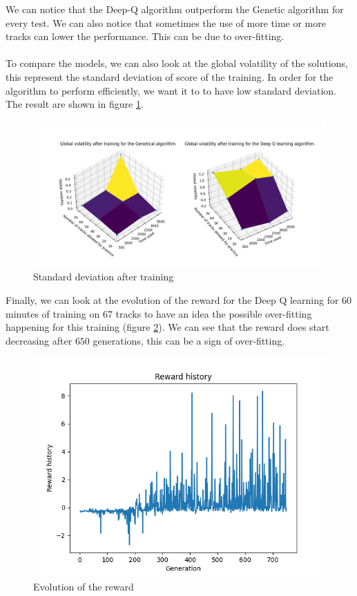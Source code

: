 \documentclass[11pt,a4paper]{article}
\newcounter{fig}
\begin{document}
We can notice that the Deep-Q algorithm outperform the Genetic algorithm for every test. We can also notice that sometimes the use of more time or more tracks can lower the performance. This can be due to over-fitting. \\
\\
To compare the models, we can also look at the global volatility of the solutions, this represent the standard deviation of score of the training. In order for the algorithm to perform efficiently, we want it to to have low standard deviation. The result are shown in figure \ref{figure:standard deviation}.
        \begin{figure}[ht]
            \centering
            \includegraphics[scale = 0.55]{comparaison3.png}
            \caption{Standard deviation after training}
            \label{figure:standard deviation}
        \end{figure}
 
\newpage
Finally, we can look at the evolution of the reward for the Deep Q learning for $60$ minutes of training on $67$ tracks to have an idea the possible over-fitting happening for this training (figure \ref{figure:evolution of the reward}). We can see that the reward does start decreasing after $650$ generations, this can be a sign of over-fitting.
        \begin{figure}[ht]
            \centering
            \includegraphics[width=0.5\linewidth]{graphe_reward.png}
            \caption{Evolution of the reward}
            \label{figure:evolution of the reward}
        \end{figure}
        
\end{document}

